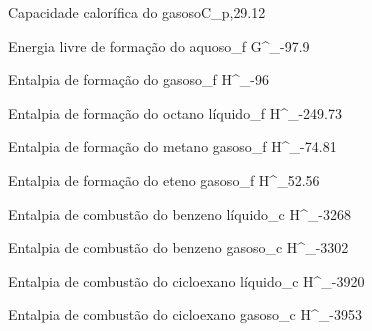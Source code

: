 

{Capacidade calorífica do  gasoso}{C_{p,}}{29.12}{\joule\per\mol\per\kelvin}


{Energia livre de formação do  aquoso}{\Delta_{f} G^{\standardstate}_{}}{-97.9}{\kilo\joule\per\mol}


{Entalpia de formação do  gasoso}{\Delta_{f} H^{\standardstate}_{}}{-96}{\kilo\joule\per\mol}



{Entalpia de formação do octano líquido}{\Delta_{f} H^{\standardstate}_{}}{-249.73}{\kilo\joule\per\mol}

{Entalpia de formação do metano gasoso}{\Delta_{f} H^{\standardstate}_{}}{-74.81}{\kilo\joule\per\mol}

{Entalpia de formação do eteno gasoso}{\Delta_{f} H^{\standardstate}_{}}{52.56}{\kilo\joule\per\mol}



{Entalpia de combustão do benzeno líquido}{\Delta_{c} H^{\standardstate}_{}}{-3268}{\kilo\joule\per\mol}

{Entalpia de combustão do benzeno gasoso}{\Delta_{c} H^{\standardstate}_{}}{-3302}{\kilo\joule\per\mol}


{Entalpia de combustão do cicloexano líquido}{\Delta_{c} H^{\standardstate}_{}}{-3920}{\kilo\joule\per\mol}

{Entalpia de combustão do cicloexano gasoso}{\Delta_{c} H^{\standardstate}_{}}{-3953}{\kilo\joule\per\mol}

